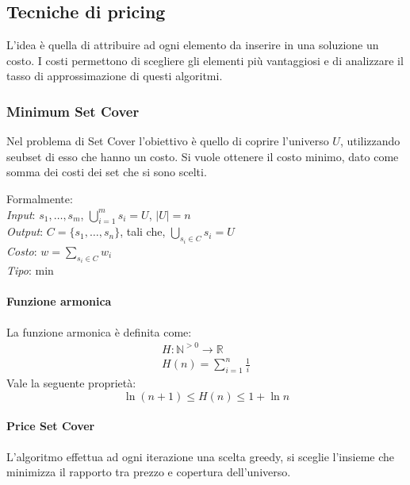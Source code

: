 \subsection{Tecniche di pricing}
L'idea è quella di attribuire ad ogni elemento da inserire in 
una soluzione un costo. I costi permettono di scegliere gli elementi 
più vantaggiosi e di analizzare il tasso di approssimazione di questi algoritmi.

\subsubsection{Minimum Set Cover}
\label{msetcover}
Nel problema di Set Cover l'obiettivo è quello di coprire l'universo $U$, 
utilizzando seubset di esso che hanno un costo. Si vuole ottenere il costo
minimo, dato come somma dei costi dei set che si sono scelti.

Formalmente: \\
\emph{Input}: $s_1, \dots, s_m$, $\bigcup_{i=1}^m s_i = U$, $|U| = n$\\
\emph{Output}: $C = \{s_1, \dots, s_n\}$, tali che, $\bigcup_{s_i \in C} s_i = U$\\
\emph{Costo}: $w = \sum_{s_i \in C} w_i$\\
\emph{Tipo}: min\\

\paragraph{Funzione armonica}
La funzione armonica è definita come: 
\begin{equation}
    \begin{aligned}
        H: \mathbb{N}^{>0} \rightarrow \mathbb{R}\\
        H(n) = \sum_{i = 1}^{n} \frac{1}{i}  
    \end{aligned}
\end{equation}
Vale la seguente proprietà: 
$$\ln (n+1) \leq H(n) \leq 1 +\ln n$$

\paragraph{Price Set Cover}
L'algoritmo effettua ad ogni iterazione una scelta greedy, 
si sceglie l'insieme che minimizza il rapporto tra prezzo e copertura 
dell'universo.

